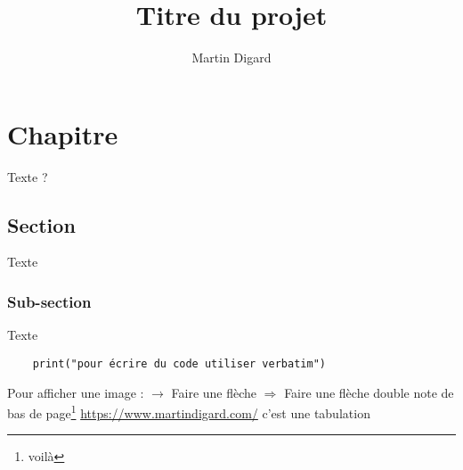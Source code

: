 \documentclass{article}
\newcommand\tab[1][5mm]{\hspace*{#1}}
\begin{document}
	\title{Titre du projet}
	\author{Martin Digard}
	\date{}
	\maketitle
	\chapter*{Chapitre}
	Texte ?
	\section*{Section}
	Texte \\	
	\subsection*{Sub-section}
	Texte
	\begin{verbatim}
	print("pour écrire du code utiliser verbatim")
	\end{verbatim}
	Pour afficher une image :
	\newpage{} %
	$\rightarrow$ Faire une flèche
	$\Rightarrow$ Faire une flèche double
        note de bas de page\footnote{voilà}
        \url{https://www.martindigard.com/}
        \tab c’est une tabulation
\end{document}

